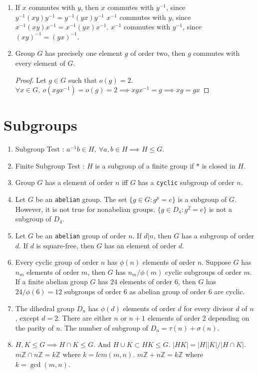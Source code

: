 \begin{enumerate}
	\item If $x$ commutes with $y$, then
		\subitem $x$ commutes with $y^{-1}$, since $y^{-1}(xy)y^{-1} = y^{-1}(yx)y^{-1}$
		\subitem $x^{-1}$ commutes with $y$, since $x^{-1}(xy)x^{-1} = x^{-1}(yx)x^{-1}$.
		\subitem $x^{-1}$ commutes with $y^{-1}$, since $(xy)^{-1} = (yx)^{-1}$.
	\item Group $G$ has precisely one element $g$ of order two, then $g$ commutes with every element of $G$.
	\begin{proof}
		Let $g \in G$ such that $o(g) = 2$.\\
		$\forall x \in G,\ o(xgx^{-1}) = o(g) = 2 \implies xgx^{-1} = g \implies xg = gx$
	\end{proof}
\end{enumerate}

\section{Subgroups}
\begin{enumerate}
	\item Subgroup Test : $a^{-1}b \in H,\ \forall a,b \in H \implies H \le G$.
	\item Finite Subgroup Test : $H$ is a subgroup of a finite group if $\ast$ is closed in $H$.
	\item Group $G$ has a element of order $n$ iff $G$ has a \texttt{cyclic} subgroup of order $n$. 
	\item Let $G$ be an \texttt{abelian} group. The set $\{ g \in G : g^p = e \}$ is a subgroup of $G$.
	However, it is not true for nonabelian groups.
	$\{ g \in D_4 : g^2 = e \}$ is not a subgroup of $D_4$.
	\item Let $G$ be an \texttt{abelian} group of order $n$. If $d|n$, then $G$ has a subgroup of order $d$. If $d$ is square-free, then $G$ has an element of order $d$.
	\item Every cyclic group of order $n$ has $\phi(n)$ elements of order $n$.
		Suppose $G$ has $n_m$ elements of order $m$, then $G$ has $n_m/\phi(m)$ cyclic subgroups of order $m$.
		\subitem If a finite abelian group $G$ has $24$ elements of order $6$, then $G$ has $24/\phi(6) = 12$ subgroups of order $6$ as abelian group of order $6$ are cyclic.
	\item The dihedral group $D_n$ has $\phi(d)$ elements of order $d$ for every divisor $d$ of $n$, except $d=2$. There are either $n$ or $n+1$ elements of order $2$ depending on the parity of $n$.
	The number of subgroup of $D_n = \tau(n)+\sigma(n)$.
	\item $H,K \le G \implies H \cap K \le G$. And $H \cup K \subset HK \le G$.
		\subitem $|HK| = |H| |K| / |H \cap K|$.
		\subitem $m\mathbb{Z} \cap n\mathbb{Z} = k\mathbb{Z}$ where $k = lcm(m,n)$.
		\subitem $m\mathbb{Z} + n\mathbb{Z} = k\mathbb{Z}$ where $k = \gcd(m,n)$.
\end{enumerate}

